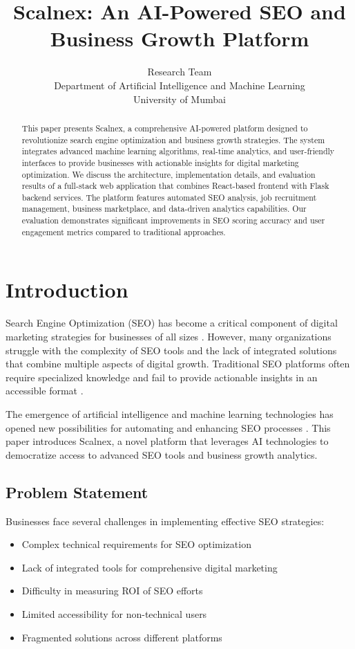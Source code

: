\documentclass[11pt,a4paper]{article}
\title{\textbf{Scalnex: An AI-Powered SEO and Business Growth Platform}}
\author{Research Team\\Department of Artificial Intelligence and Machine Learning\\University of Mumbai}
\date{} %
\begin{document}
\maketitle

\vspace{-0.5cm} %

\begin{abstract}
This paper presents Scalnex, a comprehensive AI-powered platform designed to revolutionize search engine optimization and business growth strategies. The system integrates advanced machine learning algorithms, real-time analytics, and user-friendly interfaces to provide businesses with actionable insights for digital marketing optimization. We discuss the architecture, implementation details, and evaluation results of a full-stack web application that combines React-based frontend with Flask backend services. The platform features automated SEO analysis, job recruitment management, business marketplace, and data-driven analytics capabilities. Our evaluation demonstrates significant improvements in SEO scoring accuracy and user engagement metrics compared to traditional approaches.
\end{abstract}

\section{Introduction}
\label{sec:introduction}

Search Engine Optimization (SEO) has become a critical component of digital marketing strategies for businesses of all sizes \cite{seo_importance}. However, many organizations struggle with the complexity of SEO tools and the lack of integrated solutions that combine multiple aspects of digital growth. Traditional SEO platforms often require specialized knowledge and fail to provide actionable insights in an accessible format \cite{seo_challenges}.

The emergence of artificial intelligence and machine learning technologies has opened new possibilities for automating and enhancing SEO processes \cite{ai_seo}. This paper introduces Scalnex, a novel platform that leverages AI technologies to democratize access to advanced SEO tools and business growth analytics.

\subsection{Problem Statement}
Businesses face several challenges in implementing effective SEO strategies:
\begin{itemize}
    \item Complex technical requirements for SEO optimization
    \item Lack of integrated tools for comprehensive digital marketing
    \item Difficulty in measuring ROI of SEO efforts
    \item Limited accessibility for non-technical users
    \item Fragmented solutions across different platforms
\end{itemize}
\end{document}
